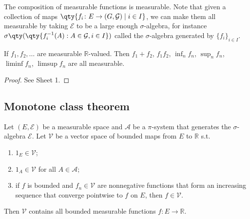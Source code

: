 \begin{example}
	The composition of measurable functions is measurable.
	Note that given a collection of maps $\qty{f_i \colon E \to (G,\mathcal G) \mid i \in I}$, we can make them all measurable by taking $\mathcal E$ to be a large enough $\sigma$-algebra, for instance $\sigma\qty(\qty{f_i^{-1}(A) : A \in \mathcal G, i \in I})$ called the $\sigma$-algebra generated by $\{f_i\}_{i \in I}$.
\end{example}

\begin{proposition}
	If $f_1, f_2, \dots$ are measurable $\mathbb{R}$-valued. Then $f_1 + f_2$, $f_1 f_2$, $\inf_n f_n$, $\sup_n f_n$, $\liminf f_n$, $\limsup f_n$ are all measurable.
\end{proposition}

\begin{proof}
	See Sheet 1.
\end{proof}

\subsection{Monotone class theorem}
\begin{theorem}
	Let $(E, \mathcal{E})$ be a measurable space and $\mathcal A$ be a $\pi$-system that generates the $\sigma$-algebra $\mathcal E$.
	Let $\mathcal V$ be a vector space of bounded maps from $E$ to $\mathbb R$ s.t.
	\begin{enumerate}
		\item $1_E \in \mathcal V$;
		\item $1_A \in \mathcal V$ for all $A \in \mathcal A$;
		\item if $f$ is bounded and $f_n \in \mathcal V$ are nonnegative functions that form an increasing sequence that converge pointwise to $f$ on $E$, then $f \in \mathcal V$.
	\end{enumerate}
	Then $\mathcal V$ contains all bounded measurable functions $f \colon E \to \mathbb R$.
\end{theorem}

